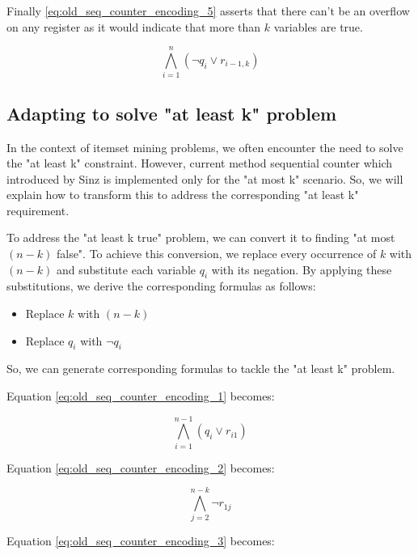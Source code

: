 Finally \ref{eq:old_seq_counter_encoding_5} asserts that there can't be an overflow
on any register as it would indicate that more than $k$ variables are true.

\begin{equation}
    \label{eq:old_seq_counter_encoding_5}
    \bigwedge_{i=1}^{n} \left(\neg q_i \vee r_{i-1,k} \right)
\end{equation}


\subsection{Adapting to solve "at least k" problem}

In the context of itemset mining problems, we often encounter the need to solve the "at least k" constraint.
However, current method sequential counter which introduced by Sinz is implemented only for the "at most k" scenario.
So, we will explain how to transform this to address the corresponding "at least k" requirement.

To address the "at least k true" problem, we can convert it to finding "at most $(n-k)$ false".
To achieve this conversion, we replace every occurrence of $k$ with $(n-k)$ and substitute each variable $q_i$
with its negation. By applying these substitutions, we derive the corresponding formulas as follows:

\begin{itemize}
    \item Replace $k$ with $(n-k)$
    \item Replace $q_i$ with $\neg q_i$
\end{itemize}

So, we can generate corresponding formulas to tackle the "at least k" problem.

Equation \ref{eq:old_seq_counter_encoding_1} becomes:

\begin{equation}
    \label{eq:old_seq_counter_encoding_1_at_least}
    \bigwedge_{i=1}^{n-1} \left( q_i \vee r_{i1} \right)
\end{equation}

Equation \ref{eq:old_seq_counter_encoding_2} becomes:

\begin{equation}
    \label{eq:old_seq_counter_encoding_2_at_least}
    \bigwedge_{j=2}^{n-k} \neg r_{1j}
\end{equation}

Equation \ref{eq:old_seq_counter_encoding_3} becomes:

